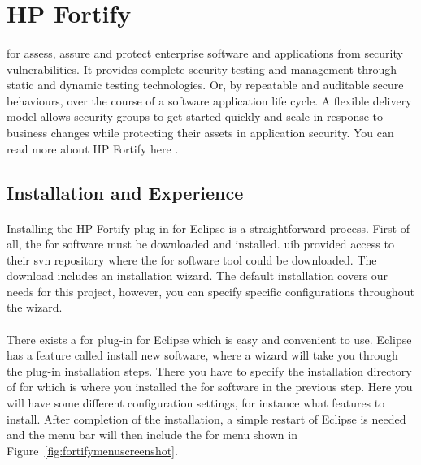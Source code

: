 \documentclass[11pt,english,a4paper]{report}
\begin{document}
\newpage

\section{HP Fortify}
\label{sectionfortifytool}
\paragraph{}
\gls{for} assess, assure and protect enterprise software and applications from security vulnerabilities.
It provides complete security testing and management through static and dynamic testing technologies. 
Or, by repeatable and auditable secure behaviours, over the course of a software application life cycle. 
A flexible delivery model allows security groups to get started quickly and scale in response to business changes while protecting their assets in application security. 
You can read more about HP Fortify here \cite{fortify-software-wiki, fortify-software-homepage-features}.

\subsection{Installation and Experience}
\paragraph{}
Installing the HP Fortify plug in for Eclipse is a straightforward process. 
First of all, the \gls{for} software must be downloaded and installed.
\gls{uib} provided access to their \gls{svn} repository where the \gls{for} software tool could be downloaded.  
The download includes an installation wizard. 
The default installation covers our needs for this project, however, you can specify specific configurations throughout the wizard. \cite{installation-usage-guide}

\paragraph{}
There exists a \gls{for} plug-in for Eclipse which is easy and convenient to use.
Eclipse has a feature called install new software, where a wizard will take you through the plug-in installation steps.
There you have to specify the installation directory of \gls{for} which is where you installed the \gls{for} software in the previous step.
Here you will have some different configuration settings, for instance what features to install.
After completion of the installation, a simple restart of Eclipse is needed and the menu bar will then include the \gls{for} menu shown in Figure~\ref{fig:fortifymenuscreenshot}. \cite{installation-usage-guide}
\end{document}

